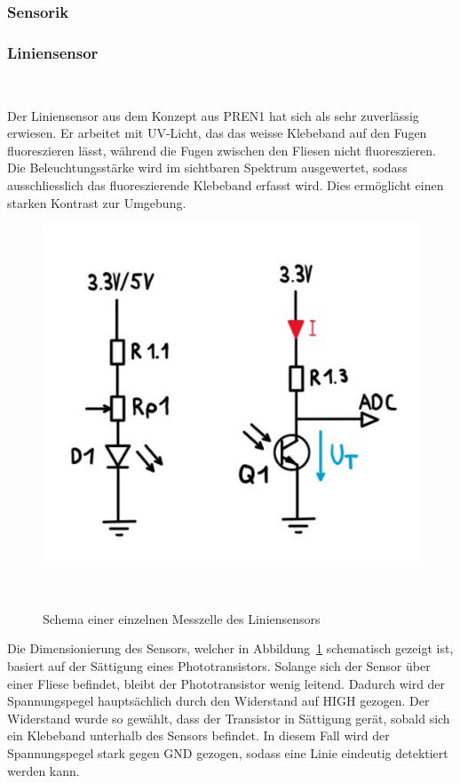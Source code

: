 \documentclass[main.tex]{subfiles} %
\begin{document}

\subsubsection{Sensorik}

\subsubsection*{Liniensensor}~\label{sec:Sensorik_Liniensensor}

Der Liniensensor aus dem Konzept aus PREN1 hat sich als sehr zuverlässig
erwiesen. Er arbeitet mit UV-Licht, das das weisse Klebeband auf den Fugen
fluoreszieren lässt, während die Fugen zwischen den Fliesen nicht
fluoreszieren. Die Beleuchtungsstärke wird im sichtbaren Spektrum ausgewertet,
sodass ausschliesslich das fluoreszierende Klebeband erfasst wird. Dies
ermöglicht einen starken Kontrast zur Umgebung.

\begin{figure}[H]
    \centering
    \includegraphics[width = 0.5\linewidth]{./fig_Antriebsregelung_Firmware/Schema_Messzelle_Liniensensor.pdf}
    \caption{Schema einer einzelnen Messzelle des Liniensensors}~\label{fig:Schema_Messtelle_Liniensensor}
\end{figure}

Die Dimensionierung des Sensors, welcher in
Abbildung~\ref{fig:Schema_Messtelle_Liniensensor} schematisch gezeigt ist,
basiert auf der Sättigung eines Phototransistors. Solange sich der Sensor über
einer Fliese befindet, bleibt der Phototransistor wenig leitend. Dadurch wird
der Spannungspegel hauptsächlich durch den Widerstand auf HIGH gezogen. Der
Widerstand wurde so gewählt, dass der Transistor in Sättigung gerät, sobald
sich ein Klebeband unterhalb des Sensors befindet. In diesem Fall wird der
Spannungspegel stark gegen GND gezogen, sodass eine Linie eindeutig detektiert
werden kann.
\end{document}
